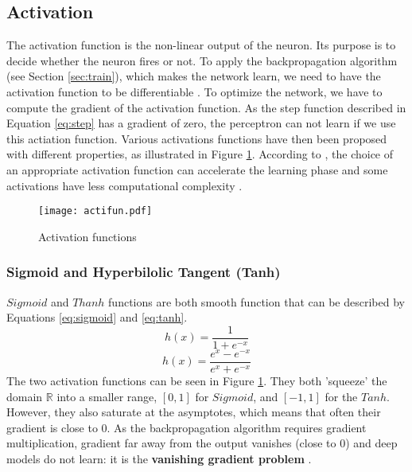 \subsection{Activation} \label{subs:acti}
The activation function is the non-linear output of the neuron. Its purpose is to decide whether the neuron fires or not. To apply the backpropagation algorithm (see Section \ref{sec:train}), which makes the network learn, we need to have the activation function to be differentiable \cite{lecun_backpropagation_1989}. To optimize the network, we have to compute the gradient of the activation function. As the step function described in Equation \eqref{eq:step} has a gradient of zero, the perceptron can not learn if we use this actiation function. Various activations functions have then been proposed with different properties, as illustrated in Figure \ref{fig:acti}. According to \textcite{khan_survey_2020}, the choice of an appropriate activation function can accelerate the learning phase and some activations have less computational complexity \cite{krizhevsky_imagenet_2012}.
%
\begin{figure}
    \centering
    \texttt{[image: actifun.pdf]}
    \caption{Activation functions}
    \label{fig:acti}
\end{figure}
%
\subsubsection{Sigmoid and Hyperbilolic Tangent (Tanh)}
$Sigmoid$ and $Thanh$ functions are both smooth function that can be described by Equations \eqref{eq:sigmoid} and \eqref{eq:tanh}.
%
\begin{equation}
    h(x) = \frac{1}{1 + e^{-x}}
    \label{eq:sigmoid}
\end{equation}
%
\begin{equation}
    h(x) = \frac{e^{x} - e^{-x}}{e^{x} + e^{-x}}
    \label{eq:tanh}
\end{equation}
%
The two activation functions can be seen in Figure \ref{fig:acti}. They both 'squeeze' the domain $\mathbb{R}$ into a smaller range, $[0, 1]$ for $Sigmoid$, and $[-1, 1]$ for the $Tanh$. However, they also saturate at the asymptotes, which means that often their gradient is close to 0. As the backpropagation algorithm requires gradient multiplication, gradient far away from the output vanishes (close to 0) and deep models do not learn: it is the \textbf{vanishing gradient problem} \cite{goodfellow_deep_2016}.
%
